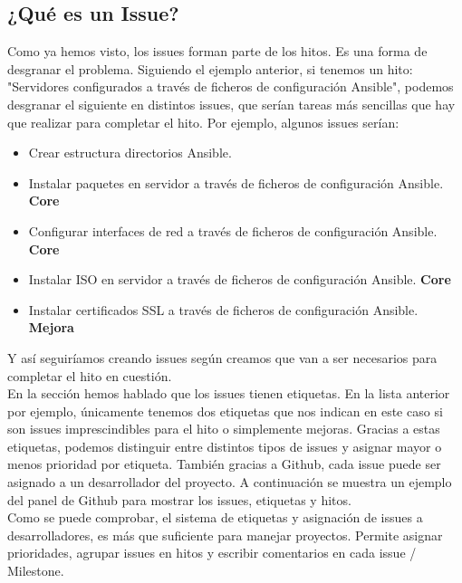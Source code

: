 \subsection{¿Qué es un Issue?}

\begin{text}
	Como ya hemos visto, los issues forman parte de los hitos. Es una forma de desgranar el problema. Siguiendo el ejemplo anterior, si tenemos un hito: "Servidores configurados a través de ficheros de configuración Ansible", podemos desgranar el siguiente en distintos issues, que serían tareas más sencillas que hay que realizar para completar el hito. Por ejemplo, algunos issues serían: 
	\begin{itemize}
		\item Crear estructura directorios Ansible.
		\item Instalar paquetes en servidor a través de ficheros de configuración Ansible. \textbf{Core}
		\item Configurar interfaces de red a través de ficheros de configuración Ansible. \textbf{Core}
		\item Instalar ISO en servidor a través de ficheros de configuración Ansible. \textbf{Core}
		\item Instalar certificados SSL a través de ficheros de configuración Ansible. \textbf{Mejora}
	\end{itemize}
	
	Y así seguiríamos creando issues según creamos que van a ser necesarios para completar el hito en cuestión. \\
	En la sección   hemos hablado que los issues tienen etiquetas. En la lista anterior por ejemplo, únicamente tenemos dos etiquetas que nos indican en este caso si son issues imprescindibles para el hito o simplemente mejoras. Gracias a estas etiquetas, podemos distinguir entre distintos tipos de issues y asignar mayor o menos prioridad por etiqueta. También gracias a Github, cada issue puede ser asignado a un desarrollador del proyecto. A continuación se muestra un ejemplo del panel de Github para mostrar los issues, etiquetas y hitos. \\
	Como se puede comprobar, el sistema de etiquetas y asignación de issues a desarrolladores, es más que suficiente para manejar proyectos. Permite asignar prioridades, agrupar issues en hitos y escribir comentarios en cada issue / Milestone. 
	
\end{text}

